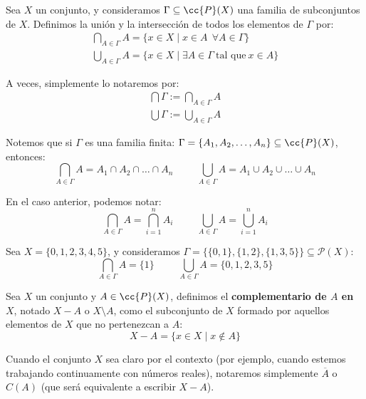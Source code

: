 \begin{definicion}
    Sea $X$ un conjunto, y consideramos $\Gamma \subseteq \cc{P}(X)$ una familia de subconjuntos de $X$. Definimos la unión y la intersección de todos los elementos de $\Gamma$ por:
    \begin{gather*}
        \bigcap_{A \in \Gamma} A = \{x \in X \mid x \in A~~\forall A \in \Gamma \}\\
        \bigcup_{A \in \Gamma} A = \{x \in X \mid \exists A \in \Gamma\ \text{tal que}\ x \in A \}
    \end{gather*}

    A veces, simplemente lo notaremos por:
    \begin{gather*}
        \bigcap \Gamma := \bigcap_{A\in \Gamma}A \\
        \bigcup \Gamma := \bigcup_{A\in \Gamma}A
    \end{gather*}

    Notemos que si $\Gamma$ es una familia finita: $\Gamma = \{A_1, A_2, \ldots, A_n\} \subseteq \cc{P}(X)$, entonces:
    \begin{equation*}
        \bigcap_{A \in \Gamma}A = A_1 \cap A_2 \cap \ldots \cap A_n
        \hspace{1cm}
        \bigcup_{A \in \Gamma}A = A_1 \cup A_2 \cup \ldots \cup A_n
    \end{equation*}
    
    En el caso anterior, podemos notar:
    \begin{equation*}
        \bigcap_{A \in \Gamma}A = \bigcap_{i=1}^n A_i
        \hspace{1cm}
        \bigcup_{A \in \Gamma}A = \bigcup_{i=1}^n A_i
    \end{equation*}
\end{definicion}

\begin{ejemplo}
Sea $X = \{0, 1, 2, 3, 4, 5\}$, y consideramos ${\Gamma = \{\{0, 1\}, \{1, 2\}, \{1, 3, 5\}\}\subseteq \mathcal{P}(X)}$:
    \begin{equation*}
        \bigcap_{A \in \Gamma}A = \{1\}
        \hspace{1cm}
        \bigcup_{A \in \Gamma}A = \{0, 1, 2, 3, 5\}
    \end{equation*}
\end{ejemplo}

\begin{definicion}[Complementario]
    Sea $X$ un conjunto y $A \in \cc{P}(X)$, definimos el \textbf{complementario de $A$ en $X$}, notado $X-A$ o $X\setminus A$, como el subconjunto de $X$ formado por aquellos elementos de $X$ que no pertenezcan a $A$:
    $$X-A = \{x \in X \mid x \notin A\}$$
\end{definicion}
\begin{notacion}
    Cuando el conjunto $X$ sea claro por el contexto (por ejemplo, cuando estemos trabajando continuamente con números reales), notaremos simplemente $\overline{A}$ o $C(A)$ (que será equivalente a escribir $X-A$).
\end{notacion}


